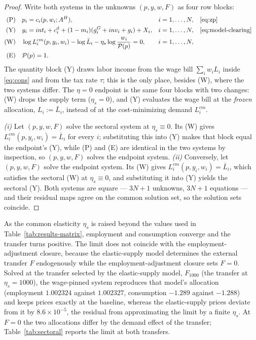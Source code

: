 \begin{proof}
Write both systems in the unknowns $(p, y, w, F)$ as four row blocks:
\begin{align*}
\text{(P)} \quad & p_i = c_i(p, w_i; A^{H}), & & i = 1,\dots,N,
   & & \text{\eqref{eq:zp}} \\
\text{(Y)} \quad & y_i = int_i + c_i^{\mathrm{d}} + (1-m_i)(g^G_i + inv_i + g_i) + X_i,
   & & i = 1,\dots,N, & & \text{\eqref{eq:model-clearing}} \\
\text{(W)} \quad & \log L^{cm}_i(p,y_i,w_i) - \log \bar{L}_i
   - \eta_s \log \frac{w_i}{\mathcal{P}(p)} = 0, & & i = 1,\dots,N, & & \\
\text{(E)} \quad & \mathcal{P}(p) = 1. & & & &
\end{align*}
The quantity block (Y) draws labor income from the wage bill
$\sum_i w_i L_i$ inside \eqref{eq:cons} and from the tax rate $\tau$; this is
the only place, besides (W), where the two systems differ. The $\eta = 0$
endpoint is the same four blocks with two changes: (W) drops the supply term
($\eta_s = 0$), and (Y) evaluates the wage bill at the \emph{frozen}
allocation, $L_i := \bar{L}_i$, instead of at the cost-minimizing demand
$L^{cm}_i$.

\emph{(i)} Let $(p,y,w,F)$ solve the sectoral system at $\eta_s \equiv 0$. Its (W)
gives $L^{cm}_i(p,y_i,w_i) = \bar{L}_i$ for every $i$; substituting this into (Y) makes
that block equal the endpoint's (Y), while (P) and (E) are identical in the two
systems by inspection, so $(p,y,w,F)$ solves the endpoint system.
\emph{(ii)} Conversely, let $(p,y,w,F)$ solve the endpoint system. Its (W) gives
$L^{cm}_i(p,y_i,w_i) = \bar{L}_i$, which satisfies the sectoral (W) at
$\eta_s \equiv 0$, and substituting it into (Y) yields the sectoral (Y).
Both systems are square --- $3N+1$ unknowns, $3N+1$ equations --- and their
residual maps agree on the common solution set, so the solution sets coincide.
\end{proof}

As the common elasticity $\eta_s$ is raised beyond the values used in
Table~\ref{tab:results-matrix}, employment and consumption converge and the
transfer turns positive. The limit does not coincide with the
employment-adjustment closure, because the elastic-supply model determines the
external transfer $F$ endogenously while the employment-adjustment closure sets
$F = 0$. Solved at the transfer selected
by the elastic-supply model, $F_{1000}$ (the transfer at $\eta_s=1000$), the wage-pinned system
reproduces that model's allocation (employment $1.002324$ against $1.002327$,
consumption $-1.289$ against $-1.288$) and keeps prices exactly at the
baseline, whereas the elastic-supply prices deviate from it by
$8.6 \times 10^{-5}$, the residual from approximating the limit by a finite
$\eta_s$. At $F = 0$ the two allocations differ by the demand effect of the
transfer; Table~\ref{tab:sectoral} reports the limit at both transfers.

